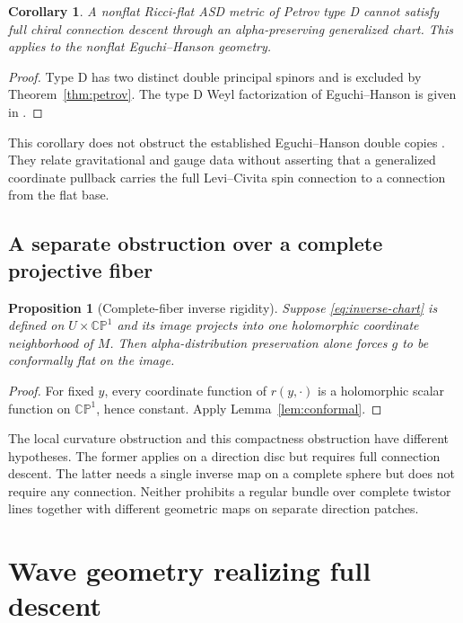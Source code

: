 \documentclass[11pt]{article}
\numberwithin{equation}{section}
\newtheorem{proposition}[theorem]{Proposition}
\newtheorem{corollary}[theorem]{Corollary}
\theoremstyle{definition}
\theoremstyle{remark}
\newcommand{\CP}{\mathbb{CP}}
\begin{document}
\begin{corollary}\label{cor:type-d}
A nonflat Ricci-flat ASD metric of Petrov type D cannot satisfy full chiral connection descent through an alpha-preserving generalized chart. This applies to the nonflat Eguchi--Hanson geometry.
\end{corollary}
\begin{proof}
Type D has two distinct double principal spinors and is excluded by Theorem~\ref{thm:petrov}. The type D Weyl factorization of Eguchi--Hanson is given in \cite[Section~5]{LMNO}.
\end{proof}

This corollary does not obstruct the established Eguchi--Hanson double copies \cite{LMNO}. They relate gravitational and gauge data without asserting that a generalized coordinate pullback carries the full Levi--Civita spin connection to a connection from the flat base.

\subsection{A separate obstruction over a complete projective fiber}

\begin{proposition}[Complete-fiber inverse rigidity]\label{prop:compact}
Suppose \eqref{eq:inverse-chart} is defined on $U\times\CP^1$ and its image projects into one holomorphic coordinate neighborhood of $M$. Then alpha-distribution preservation alone forces $g$ to be conformally flat on the image.
\end{proposition}
\begin{proof}
For fixed $y$, every coordinate function of $r(y,\cdot)$ is a holomorphic scalar function on $\CP^1$, hence constant. Apply Lemma~\ref{lem:conformal}.
\end{proof}

The local curvature obstruction and this compactness obstruction have different hypotheses. The former applies on a direction disc but requires full connection descent. The latter needs a single inverse map on a complete sphere but does not require any connection. Neither prohibits a regular bundle over complete twistor lines together with different geometric maps on separate direction patches.

\section{Wave geometry realizing full descent}\label{sec:wave}
\end{document}

